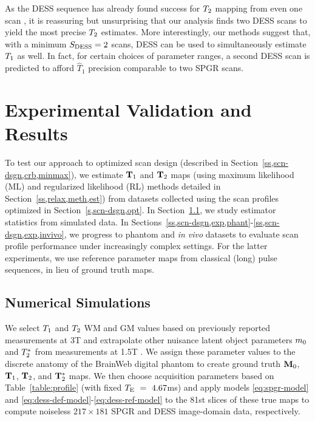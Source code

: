 As the DESS sequence has already found success 
for $T_2$ mapping from even one scan \cite{welsch:09:reo}, 
it is reassuring but unsurprising that our analysis finds two DESS scans 
to yield the most precise $T_2$ estimates. 
More interestingly, 
our methods suggest that, 
with a minimum $S_{\mathrm{DESS}} = 2$ scans, 
DESS can be used to simultaneously estimate $T_1$ as well. 
In fact, for certain choices of parameter ranges, 
a second DESS scan is predicted 
to afford $\widehat{T}_1$ precision 
comparable to two SPGR scans. 

\section{Experimental Validation and Results}
\label{s,scn-dsgn,exp}

To test our approach 
to optimized scan design 
(described in Section~\ref{ss,scn-dsgn,crb,minmax}), 
we estimate $\mathbf{T}_1$ and $\mathbf{T}_2$ maps 
(using maximum likelihood (ML) and 
regularized likelihood (RL) methods 
detailed in Section~\ref{ss,relax,meth,est}) 
from datasets collected 
using the scan profiles 
optimized in Section~\ref{s,scn-dsgn,opt}. 
In Section~\ref{ss,scn-dsgn,exp,sim}, 
we study estimator statistics from simulated data.
In Sections~\ref{ss,scn-dsgn,exp,phant}-\ref{ss,scn-dsgn,exp,invivo}, 
we progress to phantom and \emph{in vivo} datasets 
to evaluate scan profile performance 
under increasingly complex settings.
For the latter experiments, 
we use reference parameter maps 
from classical (long) pulse sequences, 
in lieu of ground truth maps.

\subsection{Numerical Simulations}
\label{ss,scn-dsgn,exp,sim}

We select $T_1$ and $T_2$ WM and GM values 
based on previously reported measurements 
at 3T \cite{wansapura:99:nrt, stanisz:05:ttr} 
and extrapolate other nuisance latent object parameters 
$m_0$ and $T_2^*$
from measurements at 1.5T \cite{kwan:99:msb}. 
We assign these parameter values
to the discrete anatomy 
of the BrainWeb digital phantom 
\cite{collins:98:dac, kwan:99:msb} 
to create ground truth $\mathbf{M}_0$, $\mathbf{T}_1$, $\mathbf{T}_2$, and $\mathbf{T}_2^*$ maps. 
We then choose acquisition parameters based 
on Table~\ref{table:profile} 
(with fixed $T_\mathrm{E}~=~4.67$ms) 
and apply models \eqref{eq:spgr-model} 
and \eqref{eq:dess-def-model}-\eqref{eq:dess-ref-model} 
to the 81st slices of these true maps 
to compute noiseless $217 \times 181$ SPGR and DESS image-domain data, 
respectively. 

